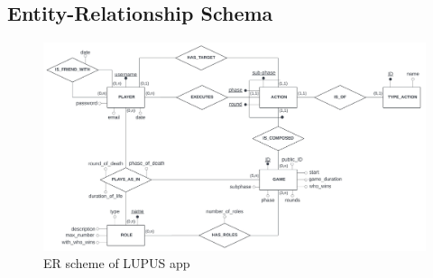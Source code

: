 \subsection{Entity-Relationship Schema}



\begin{figure}[htbp] 
    \centering
    \includegraphics[width=\textwidth]{images/scheme/er_scheme_f.jpeg}
    \caption{ER scheme of LUPUS app}
    \label{fig:er_scheme}
\end{figure}



